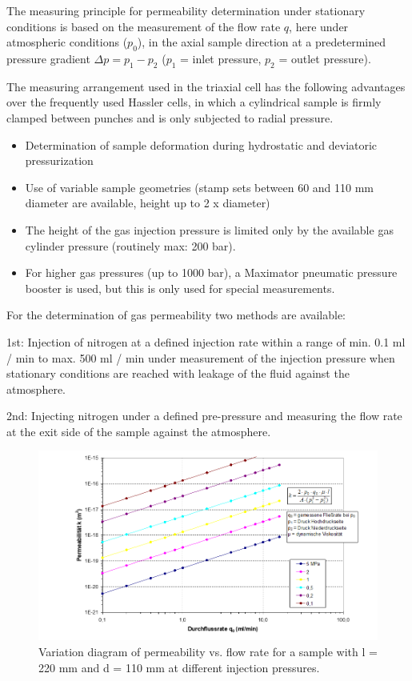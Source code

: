 The measuring principle for permeability determination under stationary conditions is based on the measurement of the 
flow rate $q$, here under atmospheric conditions ($p_0$), in the axial sample direction at a predetermined pressure gradient $\Delta p = p_1 - p_2$ ($p_1$ = inlet 
pressure, $p_2$ = outlet pressure).

The measuring arrangement used in the triaxial cell has the following advantages over the frequently used Hassler cells, in 
which a cylindrical sample is firmly clamped between punches and is only subjected to radial pressure.

\begin{itemize}
\item Determination of sample deformation during hydrostatic and deviatoric pressurization
\item Use of variable sample geometries (stamp sets between 60 and 110 mm diameter are available, height up to 2 x diameter)
\item The height of the gas injection pressure is limited only by the available gas cylinder pressure (routinely max: 200 bar).
\item For higher gas pressures (up to 1000 bar), a Maximator pneumatic pressure booster is used, but this is only used for special measurements.
\end{itemize}

For the determination of gas permeability two methods are available:

1st: Injection of nitrogen at a defined injection rate within a range of min. 0.1 ml / min to max. 500 ml / min under 
measurement of the injection pressure when stationary conditions are reached with leakage of the fluid against the atmosphere.

2nd: Injecting nitrogen under a defined pre-pressure and measuring the flow rate at the exit side of the sample against the atmosphere.

\begin{figure}[!ht]
\centering
\includegraphics[width=1\textwidth]{./figures/ifg-perme-flowrate.png}
\caption{Variation diagram of permeability vs. flow rate for a sample with l = 220 mm and d = 110 mm at different injection pressures.}
\label{fig:ifgpermeflow}
\end{figure}

